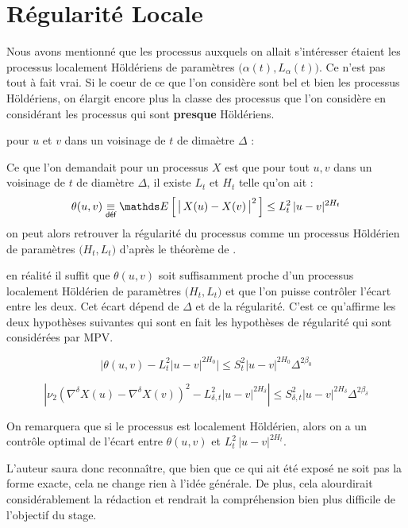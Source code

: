 \section{Régularité Locale}
\label{annexe:regularite-locale}

Nous avons mentionné que les processus auxquels on allait s'intéresser étaient les processus localement Höldériens de paramètres $\bigl(\alpha(t), L_\alpha(t)\bigr)$. Ce n'est pas tout à fait vrai. Si le coeur de ce que l'on considère sont bel et bien les processus Höldériens, on élargit encore plus la classe des processus que l'on considère en considérant les processus qui sont \textbf{presque} Höldériens. 


pour $u$ et $v$ dans un voisinage de $t$ de dimaètre $\Delta$ :


Ce que l'on demandait pour un processus $X$ est que pour tout $u,v$ dans un voisinage de $t$ de diamètre $\Delta$, il existe  $L_t$ et $H_t$ telle qu'on ait :
$$
\theta(u,v) \isdef \esperance{ \bigl\vert \, X(u) - X(v) \, \bigr\vert^2 } \leq L_t^2 \, \vert u - v \vert^{2 H_t}
$$
on peut alors retrouver la régularité du processus comme un processus Höldérien de paramètres $\bigl(H_t, L_t\bigr)$ d'après le théorème de .

en réalité il suffit que $\theta(u,v)$ soit suffisamment proche d'un processus localement Höldérien de paramètres $\bigl(H_t, L_t\bigr)$ et que l'on puisse contrôler l'écart entre les deux. Cet écart dépend de $\Delta$ et de la régularité. C'est ce qu'affirme les deux hypothèses suivantes qui sont en fait les hypothèses de régularité qui sont considérées par MPV\cite{maissoro-SmoothnessFTSweakDep}.

$$\bigl\vert \theta(u,v)-L_{t}^{2}|u-v|^{2H_{0}}\bigr\vert\leq S_{t}^{2}|u-v|^{2H_{0}}\Delta^{2\beta_{0}}$$

\cite[H6]{maissoro-SmoothnessFTSweakDep}

$$\left|\nu_{2}\left(\nabla^{\delta}X(u)-\nabla^{\delta}X(v)\right)^{2}-L_{\delta,t}^{2}|u-v|^{2H_\delta}\right|\leq S_{\delta,t}^{2}|u-v|^{2H_\delta}\Delta^{2\beta_{\delta}}$$

\cite[D1-7]{maissoro-SmoothnessFTSweakDep}


On remarquera que si le processus est localement Höldérien, alors on a un contrôle optimal de l'écart entre $\theta(u,v)$ et $L_t^2 \, \vert u - v \vert^{2 H_t}$.

L'auteur saura donc reconnaître, que bien que ce qui ait été exposé ne soit pas la forme exacte, cela ne change rien à l'idée générale. De plus, cela alourdirait considérablement la rédaction et rendrait la compréhension bien plus difficile de l'objectif du stage.
